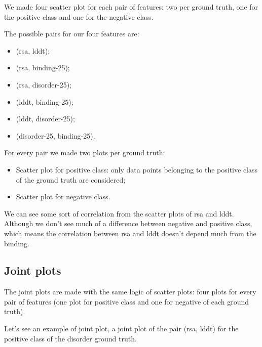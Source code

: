 We made four scatter plot for each pair of features: two per ground truth, one for the positive class and one for the negative class.

The possible pairs for our four features are: 

\begin{itemize}
    \item (rsa, lddt);
    \item (rsa, binding-25);
    \item (rsa, disorder-25);
    \item (lddt, binding-25);
    \item (lddt, disorder-25);
    \item (disorder-25, binding-25).
\end{itemize}

For every pair we made two plots per ground truth:

\begin{itemize}
    \item Scatter plot for positive class: only data points belonging to the positive class of the ground truth are considered;
    \item Scatter plot for negative class.
\end{itemize}

We can see some sort of correlation from the scatter plots of rsa and lddt. Although we don't see much of a difference between negative and positive class, which means the correlation between rsa and lddt doesn't depend much from the binding.

\vspace{10em}


\subsection{Joint plots}
The joint plots are made with the same logic of scatter plots: four plots for every pair of features (one plot for positive class and one for negative of each ground truth).

Let's see an example of joint plot, a joint plot of the pair (rsa, lddt) for the positive class of the disorder ground truth.


